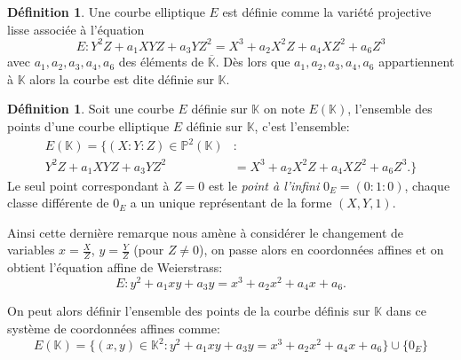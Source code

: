 \documentclass[10pt,a4paper]{book}
\theoremstyle{plain}
\theoremstyle{definition}
\theoremstyle{definition}
\theoremstyle{definition}
\theoremstyle{definition}
\theoremstyle{definition}
\newtheorem{defi}[thm]{Définition}
\theoremstyle{remark}
\theoremstyle{remark}
\theoremstyle{definition}
\begin{document}
\begin{defi}
Une courbe elliptique $E$ est définie comme la variété projective lisse 
associée à l'équation
\begin{equation}
\label{eq:weierstrass-proj}
E:Y^2Z+a_1XYZ+a_3YZ^2=X^3+a_2X^2Z+a_4XZ^2+a_6Z^3
\end{equation}
avec $a_1,a_2,a_3,a_4,a_6$ des éléments de $\overline{\mathbb{K}}$. Dès lors 
que $a_1,a_2,a_3,a_4,a_6$ appartiennent à $\mathbb{K}$ alors la courbe est dite
définie sur $\mathbb{K}$.
\end{defi}

\begin{defi}
Soit une courbe $E$ définie sur $\mathbb{K}$ on note $E(\mathbb{K})$, l'ensemble des points d'une courbe elliptique $E$ définie sur $\mathbb{K}$, c'est l'ensemble:
\begin{equation*}
\begin{alignedat}{1}
E(\mathbb{K})=\{(X:Y:Z)\in \mathbb{P}^2(\mathbb{K})  &:  \\
Y^2Z+a_1XYZ+a_3YZ^2 &= X^3+a_2X^2Z+a_4XZ^2+a_6Z^3. \}
\end{alignedat}
\end{equation*}
Le seul point correspondant à $Z=0$ est le \emph{point à l'infini} $0_E=(0:1:0)$, 
chaque classe différente de $0_E$ a un unique représentant de la forme $(X,Y,1)$. 
\end{defi}

Ainsi cette dernière remarque nous amène à considérer le changement de 
variables $x=\frac{X}{Z}$, $y=\frac{Y}{Z}$ (pour $Z \neq 0$), on passe alors en 
coordonnées affines et on obtient l'équation affine de Weierstrass:
\begin{equation}
\label{eq:weierstrass-red}
E:y^2+a_1xy+a_3y=x^3+a_2x^2+a_4x+a_6.
\end{equation}

On peut alors définir l'ensemble des points de la courbe définis sur $\mathbb{K}$ dans ce système de coordonnées affines comme:
\begin{equation*}
E(\mathbb{K})=\{(x,y)\in \mathbb{K}^2  : y^2+a_1xy+a_3y=x^3+a_2x^2+a_4x+a_6 \} \cup \{0_E\}
\end{equation*}

%
\end{document}
